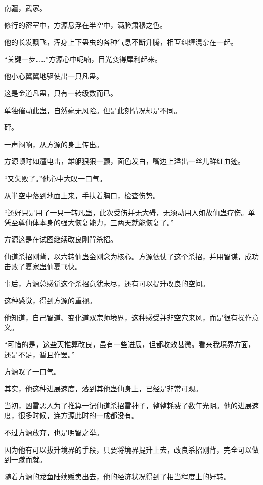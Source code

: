 
\begin{this_body}

南疆，武家。

修行的密室中，方源悬浮在半空中，满脸肃穆之色。

他的长发飘飞，浑身上下蛊虫的各种气息不断升腾，相互纠缠混杂在一起。

“关键一步……”方源心中呢喃，目光变得犀利起来。

他小心翼翼地驱使出一只凡蛊。

这是金道凡蛊，只有一转级数而已。

单独催动此蛊，自然毫无风险。但是此刻情况却是不同。

砰。

一声闷响，从方源的身上传出。

方源顿时如遭电击，雄躯狠狠一颤，面色发白，嘴边上溢出一丝儿鲜红血迹。

“又失败了。”他心中大叹一口气。

从半空中落到地面上来，手扶着胸口，检查伤势。

“还好只是用了一只一转凡蛊，此次受伤并无大碍，无须动用人如故仙蛊疗伤。单凭至尊仙体本身的强大恢复能力，三两天就能恢复了。”

方源这是在试图继续改良刚背杀招。

仙道杀招刚背，以六转仙蛊金刚念为核心。方源依仗了这个杀招，并用智谋，成功击败了夏家蛊仙夏飞快。

事后，方源总感觉这个杀招意犹未尽，还有可以提升改良的空间。

这种感觉，得到方源的重视。

他知道，自己智道、变化道双宗师境界，这种感受并非空穴来风，而是很有操作意义。

“可惜的是，这些天推算改良，虽有一些进展，但都收效甚微。看来我境界方面，还是不足，暂且作罢。”

方源叹了一口气。

其实，他这种进展速度，落到其他蛊仙身上，已经是非常可观。

当初，凶雷恶人为了推算一记仙道杀招雷神子，整整耗费了数年光阴。他的进展速度，很多时候，连方源此时的一成都没有。

不过方源放弃，也是明智之举。

因为他有可以拔升境界的手段，只要将境界提升上去，改良杀招刚背，完全可以做到一蹴而就。

随着方源的龙鱼陆续贩卖出去，他的经济状况得到了相当程度上的好转。


\end{this_body}
